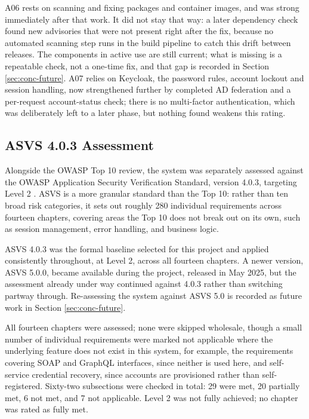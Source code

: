 A06 rests on scanning and fixing packages and container images, and was strong immediately after that work. It did not stay that way: a later dependency check found new advisories that were not present right after the fix, because no automated scanning step runs in the build pipeline to catch this drift between releases. The components in active use are still current; what is missing is a repeatable check, not a one-time fix, and that gap is recorded in Section \ref{sec:conc-future}. A07 relies on Keycloak, the password rules, account lockout and session handling, now strengthened further by completed AD federation and a per-request account-status check; there is no multi-factor authentication, which was deliberately left to a later phase, but nothing found weakens this rating.

\subsection{ASVS 4.0.3 Assessment}
\label{sec:result-asvs}

Alongside the OWASP Top 10 review, the system was separately assessed against the OWASP Application Security Verification Standard, version 4.0.3, targeting Level 2 \cite{owaspasvs}. ASVS is a more granular standard than the Top 10: rather than ten broad risk categories, it sets out roughly 280 individual requirements across fourteen chapters, covering areas the Top 10 does not break out on its own, such as session management, error handling, and business logic.

ASVS 4.0.3 was the formal baseline selected for this project and applied consistently throughout, at Level 2, across all fourteen chapters. A newer version, ASVS 5.0.0, became available during the project, released in May 2025, but the assessment already under way continued against 4.0.3 rather than switching partway through. Re-assessing the system against ASVS 5.0 is recorded as future work in Section \ref{sec:conc-future}.

All fourteen chapters were assessed; none were skipped wholesale, though a small number of individual requirements were marked not applicable where the underlying feature does not exist in this system, for example, the requirements covering SOAP and GraphQL interfaces, since neither is used here, and self-service credential recovery, since accounts are provisioned rather than self-registered. Sixty-two subsections were checked in total: 29 were met, 20 partially met, 6 not met, and 7 not applicable. Level 2 was not fully achieved; no chapter was rated as fully met.

